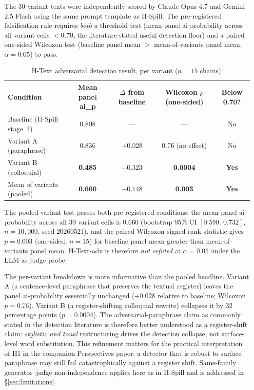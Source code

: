 \documentclass[12pt,a4paper]{article}
\begin{document}
The 30 variant texts were independently scored by Claude Opus 4.7 and Gemini 2.5 Flash using the same prompt template as H-Spill. The pre-registered falsification rule requires \emph{both} a threshold test (mean panel ai-probability across all variant cells $< 0.70$, the literature-stated useful detection floor) and a paired one-sided Wilcoxon test (baseline panel mean $>$ mean-of-variants panel mean, $\alpha = 0.05$) to pass.

\begin{table}[H]
\centering
\caption{H-Text adversarial detection result, per variant ($n = 15$ chains).}
\label{tab:htext_variants}
\small
\begin{tabular}{@{}l c c c c@{}}
\toprule
\textbf{Condition} & \textbf{Mean panel ai\_p} & \textbf{$\Delta$ from baseline} & \textbf{Wilcoxon $p$ (one-sided)} & \textbf{Below 0.70?} \\
\midrule
Baseline (H-Spill stage~1) & 0.808 & --- & --- & No \\
Variant A (paraphrase)     & 0.836 & $+0.028$ & 0.76 (no effect) & No \\
Variant B (colloquial)     & \textbf{0.485} & $\mathbf{-0.323}$ & \textbf{0.0004} & \textbf{Yes} \\
\midrule
Mean of variants (pooled)  & \textbf{0.660} & $\mathbf{-0.148}$ & \textbf{0.003} & \textbf{Yes} \\
\bottomrule
\end{tabular}
\end{table}

The pooled-variant test passes both pre-registered conditions: the mean panel ai-probability across all 30 variant cells is $0.660$ (bootstrap 95\% CI $[0.590,\, 0.732]$, $n=10{,}000$, seed $20260521$), and the paired Wilcoxon signed-rank statistic gives $p = 0.003$ (one-sided, $n = 15$) for baseline panel mean greater than mean-of-variants panel mean. H-Text-adv is therefore \emph{not refuted} at $\alpha = 0.05$ under the LLM-as-judge probe.

The per-variant breakdown is more informative than the pooled headline. Variant A (a sentence-level paraphrase that preserves the textual register) leaves the panel ai-probability essentially unchanged ($+0.028$ relative to baseline; Wilcoxon $p = 0.76$). Variant B (a register-shifting colloquial rewrite) collapses it by 32 percentage points ($p = 0.0004$). The adversarial-paraphrase claim as commonly stated in the detection literature is therefore better understood as a register-shift claim: \emph{stylistic and tonal} restructuring drives the detection collapse, not surface-level word substitution. This refinement matters for the practical interpretation of H1 in the companion Perspectives paper: a detector that is robust to surface paraphrase may still fail catastrophically against a register shift. Same-family generator--judge non-independence applies here as in H-Spill and is addressed in \S\ref{sec:limitations}.
\end{document}
